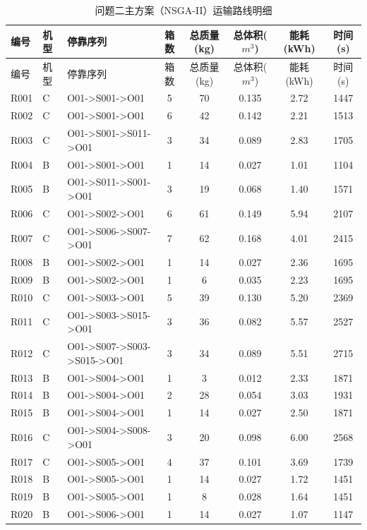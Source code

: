 ﻿\begin{center}\small\renewcommand{\arraystretch}{1.05}
\begin{longtable}{lllccccc}
\caption{问题二主方案（NSGA-II）运输路线明细}\label{app:q2_routes}\\
\hline
编号 & 机型 & 停靠序列 & 箱数 & 总质量(kg) & 总体积($m^3$) & 能耗(kWh) & 时间(s) \\
\hline\endfirsthead
\hline 编号 & 机型 & 停靠序列 & 箱数 & 总质量(kg) & 总体积($m^3$) & 能耗(kWh) & 时间(s) \\\hline\endhead
R001 & C & O01->S001->O01 & 5 & 70 & 0.135 & 2.72 & 1447 \\
R002 & C & O01->S001->O01 & 6 & 42 & 0.142 & 2.21 & 1513 \\
R003 & C & O01->S001->S011->O01 & 3 & 34 & 0.089 & 2.83 & 1705 \\
R004 & B & O01->S001->O01 & 1 & 14 & 0.027 & 1.01 & 1104 \\
R005 & B & O01->S011->S001->O01 & 3 & 19 & 0.068 & 1.40 & 1571 \\
R006 & C & O01->S002->O01 & 6 & 61 & 0.149 & 5.94 & 2107 \\
R007 & C & O01->S006->S007->O01 & 7 & 62 & 0.168 & 4.01 & 2415 \\
R008 & B & O01->S002->O01 & 1 & 14 & 0.027 & 2.36 & 1695 \\
R009 & B & O01->S002->O01 & 1 & 6 & 0.035 & 2.23 & 1695 \\
R010 & C & O01->S003->O01 & 5 & 39 & 0.130 & 5.20 & 2369 \\
R011 & C & O01->S003->S015->O01 & 3 & 36 & 0.082 & 5.57 & 2527 \\
R012 & C & O01->S007->S003->S015->O01 & 3 & 34 & 0.089 & 5.51 & 2715 \\
R013 & B & O01->S004->O01 & 1 & 3 & 0.012 & 2.33 & 1871 \\
R014 & B & O01->S004->O01 & 2 & 28 & 0.054 & 3.03 & 1931 \\
R015 & B & O01->S004->O01 & 1 & 14 & 0.027 & 2.50 & 1871 \\
R016 & C & O01->S004->S008->O01 & 3 & 20 & 0.098 & 6.00 & 2568 \\
R017 & C & O01->S005->O01 & 4 & 37 & 0.101 & 3.69 & 1739 \\
R018 & B & O01->S005->O01 & 1 & 14 & 0.027 & 1.72 & 1451 \\
R019 & B & O01->S005->O01 & 1 & 8 & 0.028 & 1.64 & 1451 \\
R020 & B & O01->S006->O01 & 1 & 14 & 0.027 & 1.07 & 1147 \\

\end{longtable}
\end{center}
